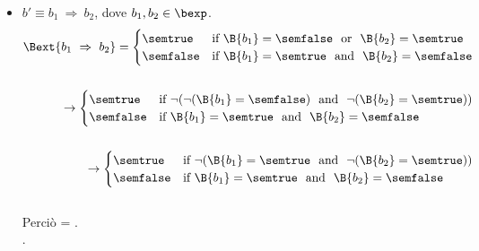 {\begin{enumerate}[label=(\alph*)]
\begin{itemize}
    \item $ b' \equiv b_1 \ \Rightarrow \ b_2$, dove $b_1, b_2 \in \bexp$. \\
    \begin{align*}
      \Bext{b_1 \ \Rightarrow \ b_2} =
      \begin{cases}
      \semtrue &
      \mbox{if} \ \B{b_1} = \semfalse \ \mbox{ or } \
                \B{b_2} = \semtrue\\
      \semfalse &
      \mbox{if} \ \B{b_1} = \semtrue \ \mbox{ and } \
                \B{b_2} = \semfalse \\
      \end{cases} \\ \\
      \rightarrow
      \begin{cases}
      \semtrue &
      \mbox{if} \ \lnot ( \lnot (\B{b_1} = \semfalse)
                \ \mbox{ and } \
                \lnot (\B{b_2} = \semtrue))\\
      \semfalse &
      \mbox{if} \ \B{b_1} = \semtrue \ \mbox{ and } \
                \B{b_2} = \semfalse \\
      \end{cases}  \\ \\
      \rightarrow
      \begin{cases}
      \semtrue &
      \mbox{if} \ \lnot ( \B{b_1} = \semtrue
                \ \mbox{ and } \
                \lnot (\B{b_2} = \semtrue))\\
      \semfalse &
      \mbox{if} \ \B{b_1} = \semtrue \ \mbox{ and } \
                \B{b_2} = \semfalse \\
      \end{cases}
    \end{align*} \\
      Perciò \Bext{b_1 \ \Rightarrow \ b_2} =
      . \\.


\end{itemize}
\end{enumerate}}
